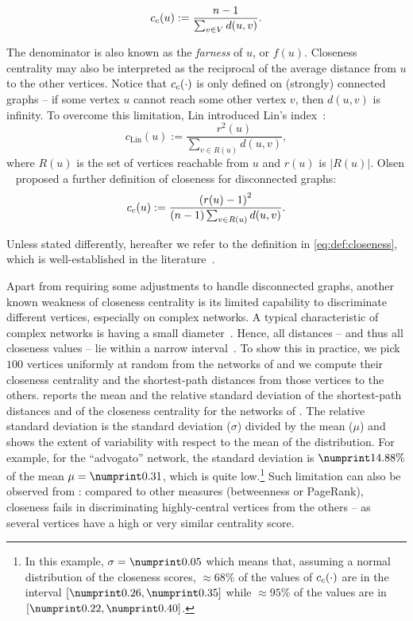 \begin{equation}
\label{eq:def:closeness}
c_c(u) := \frac{n - 1}{\sum_{v \in V} d(u, v)}.
\end{equation}

The denominator is also known as the \emph{farness} of $u$, or $f(u)$.
Closeness centrality may also be interpreted as the reciprocal of the average
distance from $u$ to the other vertices.
%
Notice that $c_c(\cdot)$ is only defined on (strongly) connected graphs -- if
some vertex $u$ cannot reach some other vertex $v$, then $d(u, v)$ is infinity.
To overcome this limitation, Lin introduced Lin's
index~\cite{lin1976foundations}:
%
\[c_{\text{Lin}}(u) := \frac{r^2(u)}{\sum_{v \in R(u)}d(u, v)},\]
%
where $R(u)$ is the set of vertices reachable from $u$ and $r(u)$ is $|R(u)|$.
Olsen \etal~\cite{DBLP:conf/icde/OlsenLH14} proposed a further definition of
closeness for disconnected graphs:
%
\[\clos(u) := \frac{\roundb{r(u) - 1}^2}{(n - 1) \sum_{v \in R(u)} d(u, v)}.\]
%

Unless stated differently, hereafter we refer to the definition in
\cref{eq:def:closeness}, which is well-established in the
literature~\cite{DBLP:journals/im/BoldiV14}.

Apart from requiring some adjustments to handle disconnected graphs,
another known weakness of closeness centrality is its limited capability to
discriminate different vertices, especially on complex networks. A typical
characteristic of complex networks is having a small
diameter~\cite{DBLP:journals/corr/cond-mat-9907038}. Hence, all distances --
and thus all closeness values -- lie within a narrow
interval~\cite{DBLP:journals/it/GrintenAM20}. To show this in practice, we pick
$100$ vertices uniformly at random from the networks of
 and we compute their closeness centrality and the
shortest-path distances from those vertices to the others.
 reports the mean and the relative standard deviation of
the shortest-path distances and of the closeness centrality for the networks of
. The relative standard deviation
is the standard deviation ($\sigma$) divided by the mean ($\mu$) and shows
the extent of variability with respect to the mean of the distribution.
For example, for the \enquote{advogato} network, the standard deviation is
$\advogatoccrstd$ of the mean $\mu = \advogatoccmean$, which is quite
low.\footnote{In this example, $\sigma = \advogatoccstd$ which means that,
assuming a normal distribution of the closeness scores, $\approx 68\%$ of
the values of $c_c(\cdot)$ are in the interval $[\advogatoonesigmabegin,
\advogatoonesigmaend]$ while $\approx 95\%$ of the values are in
$[\advogatotwosigmabegin, \advogatotwosigmaend]$.}
%
Such limitation can also be observed from : compared
to other measures (\eg betweenness or PageRank), closeness fails in discriminating
highly-central vertices from the others -- as several vertices have a high
or very similar centrality score.

